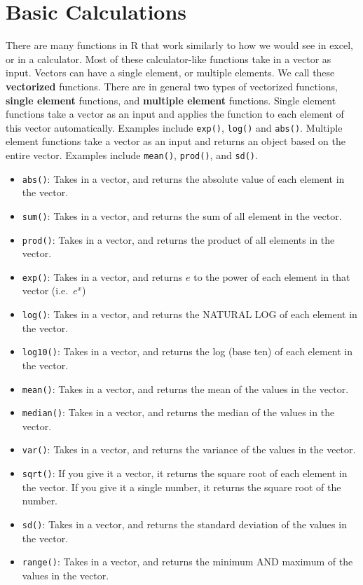 \documentclass[
]{book}
\begin{document}
\hypertarget{basic-calculations}{%
\section{Basic Calculations}\label{basic-calculations}}

There are many functions in R that work similarly to how we would see in excel, or in a calculator. Most of these calculator-like functions take in a vector as input. Vectors can have a single element, or multiple elements. We call these \textbf{vectorized} functions. There are in general two types of vectorized functions, \textbf{single element} functions, and \textbf{multiple element} functions. Single element functions take a vector as an input and applies the function to each element of this vector automatically. Examples include \texttt{exp()}, \texttt{log()} and \texttt{abs()}. Multiple element functions take a vector as an input and returns an object based on the entire vector. Examples include \texttt{mean()}, \texttt{prod()}, and \texttt{sd()}.

\begin{itemize}
\item
  \texttt{abs()}: Takes in a vector, and returns the absolute value of each element in the vector.
\item
  \texttt{sum()}: Takes in a vector, and returns the sum of all element in the vector.
\item
  \texttt{prod()}: Takes in a vector, and returns the product of all elements in the vector.
\item
  \texttt{exp()}: Takes in a vector, and returns \(e\) to the power of each element in that vector (i.e.~\(e^x\))
\item
  \texttt{log()}: Takes in a vector, and returns the NATURAL LOG of each element in the vector.
\item
  \texttt{log10()}: Takes in a vector, and returns the log (base ten) of each element in the vector.
\item
  \texttt{mean()}: Takes in a vector, and returns the mean of the values in the vector.
\item
  \texttt{median()}: Takes in a vector, and returns the median of the values in the vector.
\item
  \texttt{var()}: Takes in a vector, and returns the variance of the values in the vector.
\item
  \texttt{sqrt()}: If you give it a vector, it returns the square root of each element in the vector. If you give it a single number, it returns the square root of the number.
\item
  \texttt{sd()}: Takes in a vector, and returns the standard deviation of the values in the vector.
\item
  \texttt{range()}: Takes in a vector, and returns the minimum AND maximum of the values in the vector.
\end{itemize}
\end{document}
